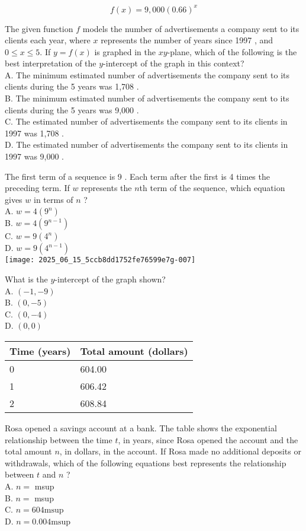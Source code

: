 $$
f(x)=9,000(0.66)^{x}
$$

The given function $f$ models the number of advertisements a company sent to its clients each year, where $x$ represents the number of years since 1997 , and $0 \leq x \leq 5$. If $y=f(x)$ is graphed in the $x y$-plane, which of the following is the best interpretation of the $y$-intercept of the graph in this context?\\
A. The minimum estimated number of advertisements the company sent to its clients during the 5 years was 1,708 .\\
B. The minimum estimated number of advertisements the company sent to its clients during the 5 years was 9,000 .\\
C. The estimated number of advertisements the company sent to its clients in 1997 was 1,708 .\\
D. The estimated number of advertisements the company sent to its clients in 1997 was 9,000 .

The first term of a sequence is 9 . Each term after the first is 4 times the preceding term. If $w$ represents the $n$th term of the sequence, which equation gives $w$ in terms of $n$ ?\\
A. $w=4\left(9^{n}\right)$\\
B. $w=4\left(9^{n-1}\right)$\\
C. $w=9\left(4^{n}\right)$\\
D. $w=9\left(4^{n-1}\right)$\\
\texttt{[image: 2025\_06\_15\_5ccb8dd1752fe76599e7g-007]}

What is the $y$-intercept of the graph shown?\\
A. $(-1,-9)$\\
B. $(0,-5)$\\
C. $(0,-4)$\\
D. $(0,0)$

\begin{center}
\begin{tabular}{|l|l|}
\hline
Time (years) & Total amount (dollars) \\
\hline
0 & 604.00 \\
\hline
1 & 606.42 \\
\hline
2 & 608.84 \\
\hline
\end{tabular}
\end{center}

Rosa opened a savings account at a bank. The table shows the exponential relationship between the time $t$, in years, since Rosa opened the account and the total amount $n$, in dollars, in the account. If Rosa made no additional deposits or withdrawals, which of the following equations best represents the relationship between $t$ and $n$ ?\\
A. $n=$ msup\\
B. $n=$ msup\\
C. $n=604 \mathrm{msup}$\\
D. $n=0.004 \mathrm{msup}$

